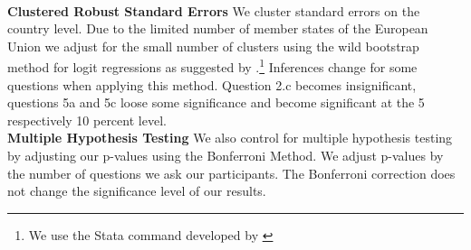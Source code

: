 \\
\textbf{Clustered Robust Standard Errors} 
We cluster standard errors on the country level. Due to the limited number of member states of the European Union we adjust for the small number of clusters using the wild bootstrap method for logit regressions as suggested by \cite{cameron}.\footnote{We use the Stata command developed by \cite{roodman}} Inferences change for some questions when applying this method. Question 2.c becomes insignificant, questions 5a and 5c loose some significance and become significant at the 5 respectively 10 percent level.  \\

\textbf{Multiple Hypothesis Testing}
We also control for multiple hypothesis testing by adjusting our p-values using the Bonferroni Method. We adjust p-values by the number of questions we ask our participants. The Bonferroni correction does not change the significance level of our results. 

